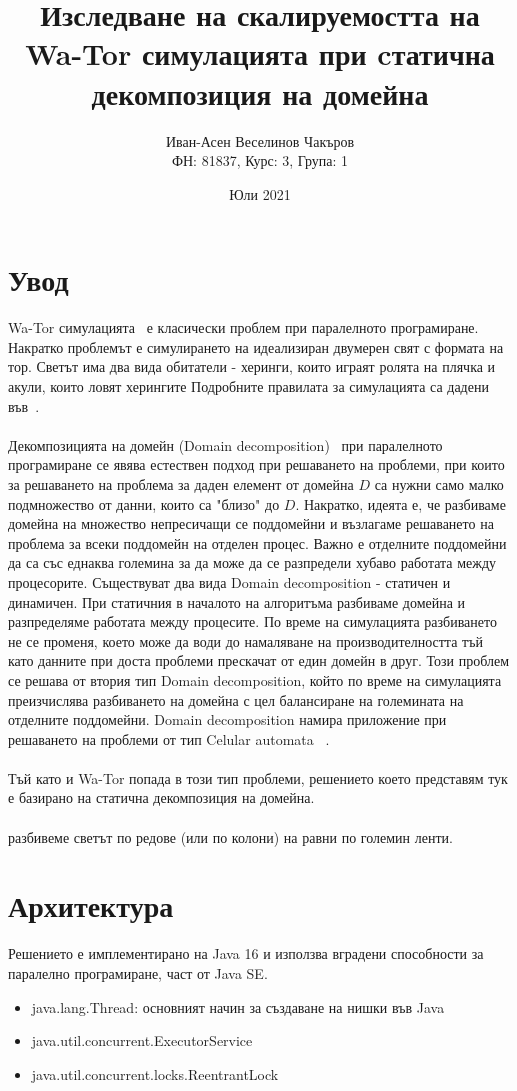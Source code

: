 \documentclass{article}
\title{Изследване на скалируемостта на Wa-Tor симулацията при cтатична декомпозиция на домейна}
\author{Иван-Асен Веселинов Чакъров \\
	ФН: 81837, Курс: 3, Група: 1}
\date{Юли 2021}
\begin{document}
\maketitle

\section{Увод}
Wa-Tor симулацията~\cite{wator} е класически проблем при паралелното програмиране.
Накратко проблемът е симулирането на идеализиран двумерен свят с формата на тор.
Светът има два вида обитатели - херинги, които играят ролята на плячка и акули, които ловят херингите
Подробните правилата за симулацията са дадени във~\cite{wator}.
\\
\\
Декомпозицията на домейн (Domain decomposition)~\cite{domain_decomposition}
при паралелното програмиране се явява естествен подход при решаването на проблеми,
при които за решаването на проблема за даден елемент от домейна $D$ са нужни само малко подмножество от данни,
които са "близо" до $D$. Накратко, идеята е, че разбиваме домейна на множество
непресичащи се поддомейни и възлагаме решаването на проблема за всеки поддомейн на
отделен процес. Важно е отделните поддомейни да са със еднаква големина за да може да се разпредели
хубаво работата между процесорите. Съществуват два вида Domain decomposition - статичен и динамичен.
При статичния в началото на алгоритъма разбиваме домейна и разпределяме работата между процесите.
По време на симулацията разбиването не се променя, което може да води до намаляване на производителността
тъй като данните при доста проблеми прескачат от един домейн в друг.
Този проблем се решава от втория тип Domain decomposition, който по време на симулацията
преизчислява разбиването на домейна с цел балансиране на големината на отделните поддомейни.
Domain decomposition намира приложение при решаването на проблеми от тип
Celular automata ~\cite{celular_automata}.
\\
\\
Тъй като и Wa-Tor попада в този тип проблеми, решението което представям тук е базирано
на статична декомпозиция на домейна.
\\
\\
разбивеме светът по редове (или по колони) на равни по големин ленти.

\section{Архитектура}
Решението е имплементирано на Java 16 и използва вградени способности за паралелно програмиране,
част от Java SE.
\begin{itemize}
	\item java.lang.Thread: основният начин за създаване на нишки във Java
	\item java.util.concurrent.ExecutorService
	\item java.util.concurrent.locks.ReentrantLock
\end{itemize}
\end{document}
